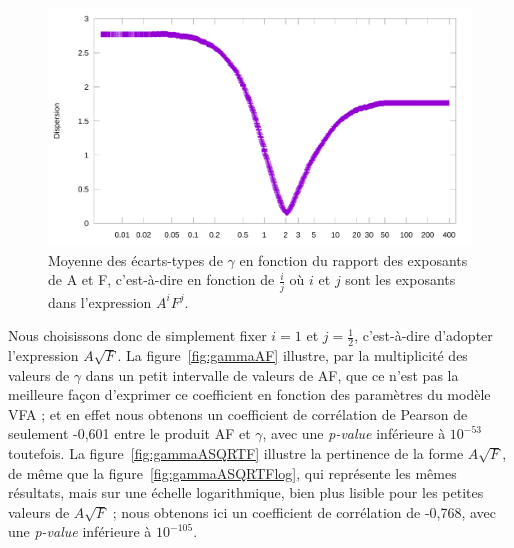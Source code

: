 	\begin{figure}[!htb]
		\centering
		\includegraphics[width=\textwidth]{figures/ch4/spread_v_expa_over_expf}
		\caption[Moyenne des écarts-types de $\gamma$ en fonction de $i/j$.]{Moyenne des écarts-types de $\gamma$ en fonction du rapport des exposants de A et F, c'est-à-dire en fonction de $\frac{i}{j}$ où $i$ et $j$ sont les exposants dans l'expression $A^{i}F^{j}$.}
		\label{fig:spread_v_expa_over_expf}
	\end{figure}
	
	Nous choisissons donc de simplement fixer $i = 1$ et $j = \frac{1}{2}$, c'est-à-dire d'adopter l'expression $A\sqrt{F}$. La figure~\ref{fig:gammaAF} illustre, par la multiplicité des valeurs de $\gamma$ dans un petit intervalle de valeurs de AF, que ce n'est pas la meilleure façon d'exprimer ce coefficient en fonction des paramètres du modèle VFA ; et en effet nous obtenons un coefficient de corrélation de Pearson de seulement -0,601 entre le produit AF et $\gamma$, avec une \emph{p-value} inférieure à $10^{-53}$ toutefois. La figure~\ref{fig:gammaASQRTF} illustre la pertinence de la forme $A\sqrt{F}$, de même que la figure~\ref{fig:gammaASQRTFlog}, qui représente les mêmes résultats, mais sur une échelle logarithmique, bien plus lisible pour les petites valeurs de $A\sqrt{F}$ ; nous obtenons ici un coefficient de corrélation de -0,768, avec une \emph{p-value} inférieure à $10^{-105}$.
	

